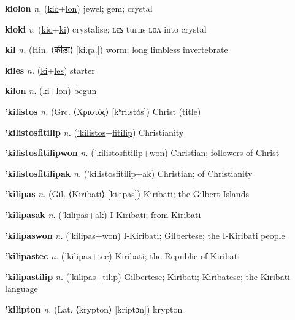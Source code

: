 \textbf{\hypertarget{kiolon}{kiolon}} \textit{n.} (\hyperlink{kio}{kio}+\allowbreak \hyperlink{lon}{lon})
jewel; gem; crystal

\textbf{\hypertarget{kioki}{kioki}} \textit{v.} (\hyperlink{kio}{kio}+\allowbreak \hyperlink{ki}{ki})
crystalise; ʟєꜱ turns ʟᴏᴧ into crystal

\textbf{\hypertarget{kil}{kil}} \textit{n.} (Hin. ⟨{\devanagari{}कीड़ा}⟩ [kiːɽaː])
worm; long limbless invertebrate

\textbf{\hypertarget{kiles}{kiles}} \textit{n.} (\hyperlink{ki}{ki}+\allowbreak \hyperlink{les}{les})
starter

\textbf{\hypertarget{kilon}{kilon}} \textit{n.} (\hyperlink{ki}{ki}+\allowbreak \hyperlink{lon}{lon})
begun

\textbf{\hypertarget{'kilistos}{'kilistos}} \textit{n.} (Grc. ⟨Χριστός⟩ [kʰriːstós])
Christ (title)

\textbf{\hypertarget{'kilistosfitilip}{'kilistosfitilip}} \textit{n.} (\hyperlink{'kilistos}{'kilistos}+\allowbreak \hyperlink{fitilip}{fitilip})
Christianity

\textbf{\hypertarget{'kilistosfitilipwon}{'kilistosfitilipwon}} \textit{n.} (\hyperlink{'kilistosfitilip}{'kilistosfitilip}+\allowbreak \hyperlink{won}{won})
Christian; followers of Christ

\textbf{\hypertarget{'kilistosfitilipak}{'kilistosfitilipak}} \textit{n.} (\hyperlink{'kilistosfitilip}{'kilistosfitilip}+\allowbreak \hyperlink{ak}{ak})
Christian; of Christianity

\textbf{\hypertarget{'kilipas}{'kilipas}} \textit{n.} (Gil. ⟨Kiribati⟩ [kiɾipas])
Kiribati; the Gilbert Islands

\textbf{\hypertarget{'kilipasak}{'kilipasak}} \textit{n.} (\hyperlink{'kilipas}{'kilipas}+\allowbreak \hyperlink{ak}{ak})
I-Kiribati; from Kiribati

\textbf{\hypertarget{'kilipaswon}{'kilipaswon}} \textit{n.} (\hyperlink{'kilipas}{'kilipas}+\allowbreak \hyperlink{won}{won})
I-Kiribati; Gilbertese; the I-Kiribati people

\textbf{\hypertarget{'kilipastec}{'kilipastec}} \textit{n.} (\hyperlink{'kilipas}{'kilipas}+\allowbreak \hyperlink{tec}{tec})
Kiribati; the Republic of Kiribati

\textbf{\hypertarget{'kilipastilip}{'kilipastilip}} \textit{n.} (\hyperlink{'kilipas}{'kilipas}+\allowbreak \hyperlink{tilip}{tilip})
Gilbertese; Kiribati; Kiribatese; the Kiribati language

\textbf{\hypertarget{'kilipton}{'kilipton}} \textit{n.} (Lat. ⟨krypton⟩ [kriptɔn])
krypton

